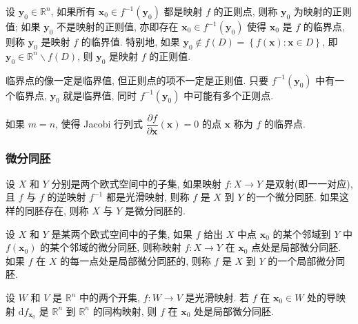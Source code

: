 \begin{definition}
  设 \(\boldsymbol{y}_0\in\mathbb{R}^n\), 如果所有 \(\boldsymbol{x}_0\in f^{-1}\left(\boldsymbol{y}_0\right)\) 都是映射 \(f\) 的正则点, 则称 \(\boldsymbol{y}_0\) 为映射的正则值; 如果 \(\boldsymbol{y}_0\) 不是映射的正则值, 亦即存在 \(\boldsymbol{x}_0\in f^{-1}\left(\boldsymbol{y}_0\right)\) 使得 \(\boldsymbol{x}_0\) 是 \(f\) 的临界点, 则称 \(\boldsymbol{y}_0\) 是映射 \(f\) 的临界值. 特别地, 如果 \(\boldsymbol{y}_0\notin f(D)=\left\lbrace f(\boldsymbol{x}): \boldsymbol{x}\in D\right\rbrace\), 即 \(\boldsymbol{y}_0\in\mathbb{R}^n\backslash f(D)\), 则 \(\boldsymbol{y}_0\) 是映射 \(f\) 的正则值.
\end{definition}

临界点的像一定是临界值, 但正则点的项不一定是正则值. 只要 \(f^{-1}\left(\boldsymbol{y}_0\right)\) 中有一个临界点, \(\boldsymbol{y}_0\) 就是临界值, 同时 \(f^{-1}\left(\boldsymbol{y}_0\right)\) 中可能有多个正则点.

如果 \(m=n\), 使得 Jacobi 行列式 \(\dfrac{\partial f}{\partial \boldsymbol{x}}\left(\boldsymbol{x}\right)=0\) 的点 \(\boldsymbol{x}\) 称为 \(f\) 的临界点.

\subsubsection{微分同胚}

\begin{definition}
  设 \(X\) 和 \(Y\) 分别是两个欧式空间中的子集, 如果映射 \(f:X\to Y\) 是双射(即一一对应), 且 \(f\) 与 \(f\) 的逆映射 \(f^{-1}\) 都是光滑映射, 则称 \(f\) 是 \(X\) 到 \(Y\) 的一个微分同胚. 如果这样的同胚存在, 则称 \(X\) 与 \(Y\) 是微分同胚的.
\end{definition}

\begin{definition}
  设 \(X\) 和 \(Y\) 是某两个欧式空间中的子集, 如果 \(f\) 给出 \(X\) 中点 \(\boldsymbol{x}_0\) 的某个邻域到 \(Y\) 中 \(f\left(\boldsymbol{x}_0\right)\) 的某个邻域的微分同胚, 则称映射 \(f:X\to Y\) 在 \(\boldsymbol{x}_0\) 点处是局部微分同胚. 如果 \(f\) 在 \(X\) 的每一点处是局部微分同胚的, 则称 \(f\) 是 \(X\) 到 \(Y\) 的一个局部微分同胚.
\end{definition}

\begin{theorem}[反函数定理]
  设 \(W\) 和 \(V\) 是 \(\mathbb{R}^n\) 中的两个开集, \(f:W\to V\) 是光滑映射. 若 \(f\) 在 \(\boldsymbol{x}_0\in W\) 处的导映射 \(\mathrm{d}f_{\boldsymbol{x}_0}\) 是 \(\mathbb{R}^n\) 到 \(\mathbb{R}^n\) 的同构映射, 则 \(f\) 在 \(\boldsymbol{x}_0\) 处是局部微分同胚.
\end{theorem}

